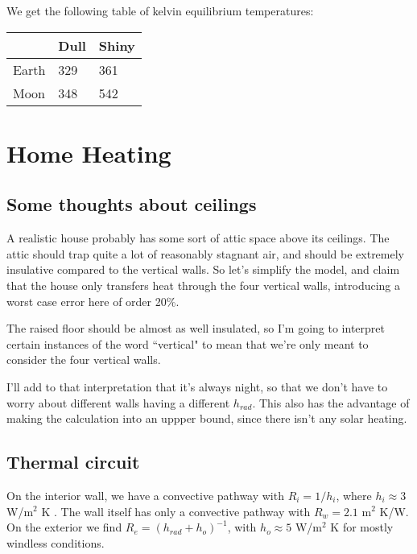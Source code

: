 \documentclass[12pt]{article}
\begin{document}
We get the following table of kelvin equilibrium temperatures:

\begin{center}

\begin{tabular}{|l|l|l|}

\hline

\,& Dull & Shiny \\ \hline
Earth &  329 & 361\\ \hline
Moon &  348  & 542\\ \hline


\end{tabular}

\end{center}

\section{Home Heating}

\subsection{Some thoughts about ceilings}

A realistic house probably has some sort of attic space above its ceilings. The attic should trap quite a lot of reasonably stagnant air, and should be extremely insulative compared to the vertical walls. So let's simplify the model, and claim that the house only transfers heat through the four vertical walls, introducing a worst case error here of order 20\%.

The raised floor should be almost as well insulated, so I'm going to interpret certain instances of the word ``vertical" to mean that we're only meant to consider the four vertical walls.

I'll add to that interpretation that it's always night, so that we don't have to worry about different walls having a different \(h_{rad}\). This also has the advantage of making the calculation into an uppper bound, since there isn't any solar heating.

\subsection{Thermal circuit}

On the interior wall, we have a convective pathway with \(R_i = 1/h_{i}\), where \(h_i \approx 3\) W/m\(^2\) K . The wall itself has only a convective pathway with \(R_w = 2.1\) m\(^2\) K/W. On the exterior we find \(R_e = (h_{rad}+h_o)^{-1}\), with \(h_o \approx 5\)  W/m\(^2\) K for mostly windless conditions.
\end{document}

